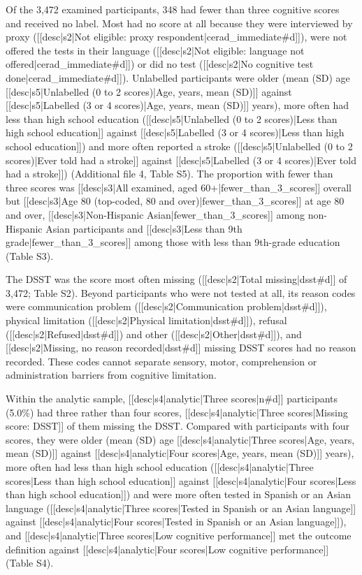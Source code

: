 \documentclass[12pt]{article}
\begin{document}
Of the 3,472 examined participants, 348 had fewer than three cognitive scores and received no label. Most had no score at all because they were interviewed by proxy ([[desc|s2|Not eligible: proxy respondent|cerad_immediate#d]]), were not offered the tests in their language ([[desc|s2|Not eligible: language not offered|cerad_immediate#d]]) or did no test ([[desc|s2|No cognitive test done|cerad_immediate#d]]). Unlabelled participants were older (mean (SD) age [[desc|s5|Unlabelled (0 to 2 scores)|Age, years, mean (SD)]] against [[desc|s5|Labelled (3 or 4 scores)|Age, years, mean (SD)]] years), more often had less than high school education ([[desc|s5|Unlabelled (0 to 2 scores)|Less than high school education]] against [[desc|s5|Labelled (3 or 4 scores)|Less than high school education]]) and more often reported a stroke ([[desc|s5|Unlabelled (0 to 2 scores)|Ever told had a stroke]] against [[desc|s5|Labelled (3 or 4 scores)|Ever told had a stroke]]) (Additional file 4, Table S5). The proportion with fewer than three scores was [[desc|s3|All examined, aged 60+|fewer_than_3_scores]] overall but [[desc|s3|Age 80 (top-coded, 80 and over)|fewer_than_3_scores]] at age 80 and over, [[desc|s3|Non-Hispanic Asian|fewer_than_3_scores]] among non-Hispanic Asian participants and [[desc|s3|Less than 9th grade|fewer_than_3_scores]] among those with less than 9th-grade education (Table S3).

The DSST was the score most often missing ([[desc|s2|Total missing|dsst#d]] of 3,472; Table S2). Beyond participants who were not tested at all, its reason codes were communication problem ([[desc|s2|Communication problem|dsst#d]]), physical limitation ([[desc|s2|Physical limitation|dsst#d]]), refusal ([[desc|s2|Refused|dsst#d]]) and other ([[desc|s2|Other|dsst#d]]), and [[desc|s2|Missing, no reason recorded|dsst#d]] missing DSST scores had no reason recorded. These codes cannot separate sensory, motor, comprehension or administration barriers from cognitive limitation.

Within the analytic sample, [[desc|s4|analytic|Three scores|n#d]] participants (5.0\%) had three rather than four scores, [[desc|s4|analytic|Three scores|Missing score: DSST]] of them missing the DSST. Compared with participants with four scores, they were older (mean (SD) age [[desc|s4|analytic|Three scores|Age, years, mean (SD)]] against [[desc|s4|analytic|Four scores|Age, years, mean (SD)]] years), more often had less than high school education ([[desc|s4|analytic|Three scores|Less than high school education]] against [[desc|s4|analytic|Four scores|Less than high school education]]) and were more often tested in Spanish or an Asian language ([[desc|s4|analytic|Three scores|Tested in Spanish or an Asian language]] against [[desc|s4|analytic|Four scores|Tested in Spanish or an Asian language]]), and [[desc|s4|analytic|Three scores|Low cognitive performance]] met the outcome definition against [[desc|s4|analytic|Four scores|Low cognitive performance]] (Table S4).
\end{document}
